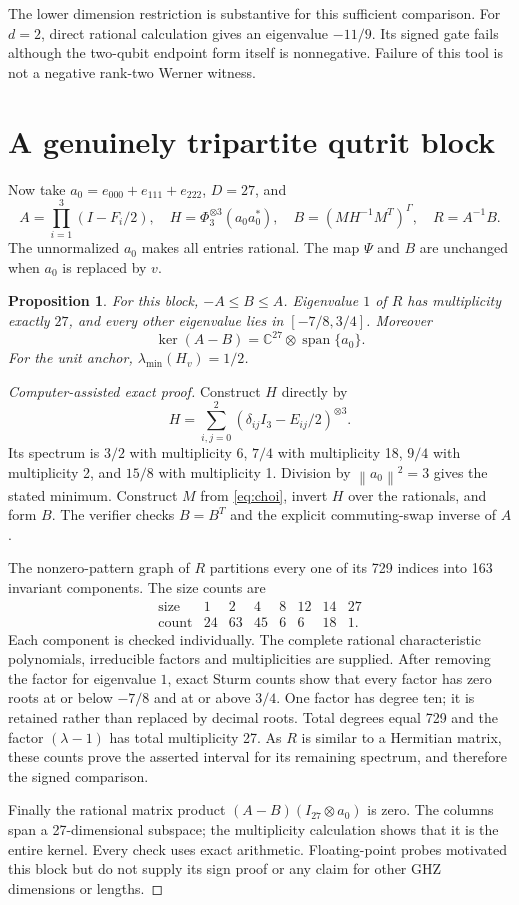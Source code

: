 \documentclass[11pt,a4paper]{article}
\newtheorem{proposition}[theorem]{Proposition}
\newcommand{\norm}[1]{\left\lVert#1\right\rVert}
\begin{document}
The lower dimension restriction is substantive for this sufficient comparison. For $d=2$, direct rational calculation gives an eigenvalue $-11/9$. Its signed gate fails although the two-qubit endpoint form itself is nonnegative. Failure of this tool is not a negative rank-two Werner witness.

\section{A genuinely tripartite qutrit block}
Now take $a_0=e_{000}+e_{111}+e_{222}$, $D=27$, and
\[
 A=\prod_{i=1}^3(I-F_i/2),\quad
 H=\Phi_3^{\otimes3}(a_0a_0^*),\quad
 B=(MH^{-1}M^T)^\Gamma,\quad R=A^{-1}B.
\]
The unnormalized $a_0$ makes all entries rational. The map $\Psi$ and $B$ are unchanged when $a_0$ is replaced by $v$.
\begin{proposition}\label{prop:ghz}
For this block, $-A\le B\le A$. Eigenvalue $1$ of $R$ has multiplicity exactly $27$, and every other eigenvalue lies in $[-7/8,3/4]$. Moreover
\[
 \ker(A-B)=\mathbb C^{27}\otimes\operatorname{span}\{a_0\}.
\]
For the unit anchor, $\lambda_{\min}(H_v)=1/2$.
\end{proposition}
\begin{proof}[Computer-assisted exact proof]
Construct $H$ directly by
\begin{equation}\label{eq:ghzH}
 H=\sum_{i,j=0}^2(\delta_{ij}I_3-E_{ij}/2)^{\otimes3}.
\end{equation}
Its spectrum is $3/2$ with multiplicity 6, $7/4$ with multiplicity 18, $9/4$ with multiplicity 2, and $15/8$ with multiplicity 1. Division by $\norm{a_0}^2=3$ gives the stated minimum. Construct $M$ from \eqref{eq:choi}, invert $H$ over the rationals, and form $B$. The verifier checks $B=B^T$ and the explicit commuting-swap inverse of $A$.

The nonzero-pattern graph of $R$ partitions every one of its 729 indices into 163 invariant components. The size counts are
\[
\begin{array}{c|rrrrrrr}
\text{size}&1&2&4&8&12&14&27\\\hline
\text{count}&24&63&45&6&6&18&1.
\end{array}
\]
Each component is checked individually. The complete rational characteristic polynomials, irreducible factors and multiplicities are supplied. After removing the factor for eigenvalue $1$, exact Sturm counts show that every factor has zero roots at or below $-7/8$ and at or above $3/4$. One factor has degree ten; it is retained rather than replaced by decimal roots. Total degrees equal 729 and the factor $(\lambda-1)$ has total multiplicity 27. As $R$ is similar to a Hermitian matrix, these counts prove the asserted interval for its remaining spectrum, and therefore the signed comparison.

Finally the rational matrix product $(A-B)(I_{27}\otimes a_0)$ is zero. The columns span a 27-dimensional subspace; the multiplicity calculation shows that it is the entire kernel. Every check uses exact arithmetic. Floating-point probes motivated this block but do not supply its sign proof or any claim for other GHZ dimensions or lengths.
\end{proof}
\end{document}
